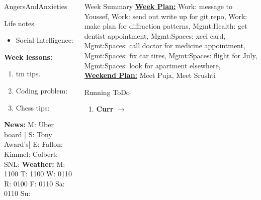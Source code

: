 \begin{columns}
\begin{column}{0.5\columnwidth}
\begin{columns}
\begin{column}{0.20\linewidth}
\begin{block}{AngersAndAnxieties}
\begin{itemize}
      \end{itemize}
    \end{block}
      \begin{block}{Life notes}
        \begin{itemize}
          \tiny \item \tiny Social Intelligence: 
        \end{itemize}
      \end{block}
      \begin{block}
        {\tiny {\bf Week lessons:}}
        \begin{enumerate}
        \item \tiny tm tips.
        \item \tiny Coding problem: 
        \item \tiny Chess tips: 
        \end{enumerate}
            {{\tiny {\tiny \bf  News:}} {\tiny  M: Uber board | S:
                Tony Award's| E: Fallon:  Kimmel:  Colbert: SNL:}}
            {{\tiny {\tiny \bf  Weather:}} {\tiny M: 1100 T: 1100 W:
                0110 R: 0100 F: 0110 Sa: 0110 Su: }}
      \end{block}
  \end{column}
  \begin{column}{0.6\linewidth}
    \begin{block}{Week Summary} 
      {\underline {\bf Week Plan:} 
        Work: message to Youssef,
        Work: send out write up for git repo, Work: make plan for diffraction patterns, 
        Mgmt:Health: get dentist appointment, Mgmt:Spaces: xcel card,
        Mgmt:Spaces: call doctor for medicine appointment,
        Mgmt:Spaces: fix car tires, Mgmt:Spaces: flight for July,
        Mgmt:Spaces: look for apartment elsewhere,} \\

      {\underline{\bf Weekend Plan:} Meet Puja, Meet Srushti }\\
    \end{block} 
      \begin{block}{Running ToDo} %
        \begin{enumerate} 
        \tiny \item \tiny \textbf{Curr} $\rightarrow$ 
      

\end{enumerate}
\end{block}
\end{column}
\end{columns}
\end{column}
\end{columns}
